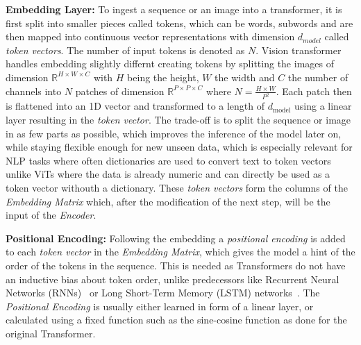 \textbf{Embedding Layer:} To ingest a sequence or an image into a transformer, it is first split into smaller pieces called tokens, which can be words, subwords and are then mapped into continuous vector representations with dimension $d_{model}$ called \emph{token vectors}.
The number of input tokens is denoted as $N$.
Vision transformer handles embedding slightly differnt creating tokens by splitting the images of dimension $\mathbb{R} ^{H \times W \times C}$ with $H$ being the height, $W$ the width and $C$ the number of channels into $N$ patches of dimension $\mathbb{R} ^{P \times P \times C}$ where $N = \frac{H \times W}{P^2}$.
Each patch then is flattened into an 1D vector and transformed to a length of $d_{\text{model}}$  using a linear layer resulting in the \emph{token vector}.
The trade-off is to split the sequence or image in as few parts as possible, which improves the inference of the model later on, while staying flexible enough for new unseen data, which is especially relevant for NLP tasks where often dictionaries are used to convert text to token vectors unlike ViTs where the data is already numeric and can directly be used as a token vector withouth a dictionary. 
These \emph{token vectors} form the columns of the \emph{Embedding Matrix} which, after the modification of the next step, will be the input of the \emph{Encoder}.

\textbf{Positional Encoding:} Following the embedding a \emph{positional encoding} is added to each \emph{token vector} in the \emph{Embedding Matrix}, which gives the model a hint of the order of the tokens in the sequence. 
This is needed as Transformers do not have an inductive bias about token order, unlike predecessors like Recurrent Neural Networks (RNNs)~\cite{Salehinejad2018} or Long Short-Term Memory (LSTM) networks~\cite{Hochreiter1997}.
The \emph{Positional Encoding} is usually either learned in form of a linear layer, or calculated using a fixed function such as the sine-cosine function as done for the original Transformer. 

